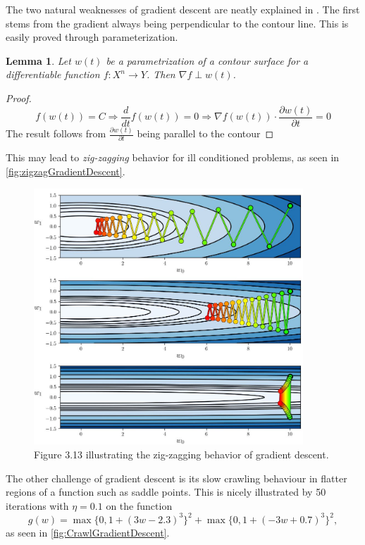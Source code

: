 \documentclass{article}
\newtheorem{lemma}[theorem]{Lemma}
\theoremstyle{definition}
\begin{document}
The two natural weaknesses of gradient descent are neatly explained in \textcite[p.~65--71]{MLRefined}. The first stems from the gradient always being perpendicular to the contour line. This is easily proved through parameterization.

\begin{lemma}
    Let $w(t)$ be a parametrization of a contour surface for a differentiable function $f: X^n \rightarrow Y$. Then $\nabla f \perp w(t)$. 
\end{lemma}

\begin{proof}
$$f(w(t)) = C \Rightarrow \frac{d}{dt} f(w(t)) = 0 \Rightarrow \nabla f(w(t)) \cdot \frac{\partial w(t)}{\partial t} = 0$$
The result follows from $\frac{\partial w(t)}{\partial t}$ being parallel to the contour
\end{proof}

This may lead to \textit{zig-zagging} behavior for ill conditioned problems, as seen in \autoref{fig:zigzagGradientDescent}.

\begin{figure}[H]
    \centering
    \includegraphics[width=0.9\textwidth]{Project2/figures/Gradient_descent_zigzag.jpeg}
    \caption{Figure 3.13 \parencite[p.~68]{MLRefined} illustrating the zig-zagging behavior
of gradient descent.}
    \label{fig:zigzagGradientDescent}
\end{figure}

The other challenge of gradient descent is its slow crawling behaviour in flatter regions of a function such as saddle points. This is nicely illustrated by 50 iterations with $\eta = 0.1$ on the function 
\begin{equation*}
    g(w) =  \max\{0, 1 + (3w - 2.3)^3\}^2 + \max\{0, 1 + (-3w + 0.7)^3\}^2,
\end{equation*}
as seen in \autoref{fig:CrawlGradientDescent}.
\end{document}
